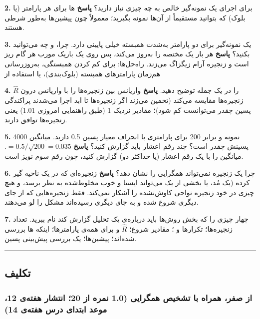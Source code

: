 \textbf{2.} برای اجرای یک نمونه‌گیر  خالص به چه چیزی نیاز
دارید؟ \textbf{پاسخ} ها برای هر پارامتر (یا بلوک)
که بتوانید مستقیماً از آن‌ها نمونه بگیرید؛ معمولاً چون پیشین‌ها به‌طور شرطی
 هستند.

\textbf{3.} یک نمونه‌گیر  برای دو پارامتر به‌شدت همبسته 
خیلی پایینی دارد. چرا، و چه می‌توانید بکنید؟ \textbf{پاسخ}  هر
بار یک مختصه را به‌روز می‌کند، پس روی یک  باریک مورب هر گام ریز
است و زنجیره آرام زیگزاگ می‌زند. راه‌حل‌ها:  برای کم
کردن همبستگی، به‌روزرسانی هم‌زمان پارامترهای همبسته (بلوک‌بندی)، یا استفاده
از 

\textbf{4.} \(\hat R\) را در یک جمله توضیح دهید. \textbf{پاسخ} واریانس
بین زنجیره‌ها را با واریانس درون زنجیره‌ها مقایسه می‌کند (تخمین می‌زند اگر
زنجیره‌ها تا ابد اجرا می‌شدند پراکندگی پسین چقدر می‌توانست کم شود)؛ مقادیر
نزدیک 1 (طبق راهنمایی امروزی \lr{\textless} 1.01) یعنی زنجیره‌ها توافق
دارند.

\textbf{5.} 4000 نمونه و  برابر 200 برای پارامتری با انحراف
معیار پسین 0.5 دارید.  میانگین پسینش چقدر است؟ چند رقم اعشار
باید گزارش کنید؟ \textbf{پاسخ}  \(= 0.5/\sqrt{200} = 0.035\).
میانگین را با یک رقم اعشار (یا حداکثر دو) گزارش کنید، چون رقم سوم نویز
 است.

\textbf{6.} چرا یک زنجیره نمی‌تواند همگرایی را نشان دهد؟ \textbf{پاسخ}
زنجیره‌ای که در یک ناحیه گیر کرده (یک مُد، یا بخشی از یک 
می‌تواند ایستا و خوب مخلوط‌شده به نظر برسد، و هیچ چیزی در خود زنجیره نواحی
کاوش‌نشده را آشکار نمی‌کند. فقط زنجیره‌هایی که از جای دیگری شروع شده و به
جای دیگری رسیده‌اند مشکل را لو می‌دهند.

\textbf{7.} چهار چیزی را که بخش روش‌ها باید درباره‌ی یک تحلیل 
گزارش کند نام ببرید. تعداد زنجیره‌ها؛ تکرارها و ؛ مقادیر
شروع؛ \(\hat R\) و  برای همه‌ی پارامترها؛ اینکه ها
بررسی شده‌اند؛ پیشین‌ها؛ یک بررسی پیش‌بینی پسین.

\begin{center}\rule{0.5\linewidth}{0.5pt}\end{center}


\subsection{تکلیف}

\subsubsection{\texorpdfstring{ از صفر، همراه با تشخیص
همگرایی (1.0 نمره از 20؛ انتشار هفته‌ی 12، موعد ابتدای درس هفته‌ی
14)}{A5: MCMC از صفر، همراه با تشخیص همگرایی (1.0 نمره از 20؛ انتشار هفته‌ی 12، موعد ابتدای درس هفته‌ی 14)}}

